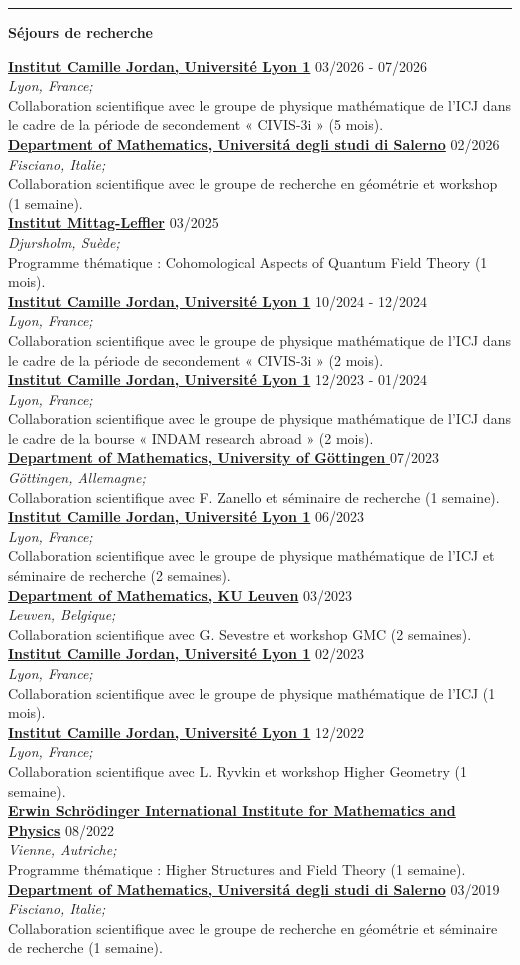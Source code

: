 \documentclass[a4paper]{article}
\newcommand{\block}[1]{\hrule \vspace{0.2cm} \textbf{\Large #1} \vspace{0.2cm}}
\newcommand{\voice}[5]{\href{#4}{\textbf{#1}} \hfill #2 \\ \textit{#3} \\ {\small #5} \vspace{0.2cm} \\}
\begin{document}
\vspace{1em}

	\block{Séjours de recherche}

    \voice{Institut Camille Jordan, Université Lyon 1}
        {03/2026 - 07/2026}
        {Lyon, France;}
        {https://physmath.pages.math.cnrs.fr/}
        {Collaboration scientifique avec le groupe de physique mathématique de l'ICJ dans le cadre de la période de secondement « CIVIS-3i » (5 mois).}
    \voice{Department of Mathematics, Universit\'a degli studi di Salerno}
        {02/2026}
        {Fisciano, Italie;}
        {http://geometria.dipmat.unisa.it/events.html}
        {Collaboration scientifique avec le groupe de recherche en géométrie et workshop (1 semaine).}
    \voice{Institut Mittag-Leffler}
        {03/2025}
        {Djursholm, Suède;}
        {https://www.mittag-leffler.se/activities/cohomological-aspects-of-quantum-field-theory/}
        {Programme thématique : Cohomological Aspects of Quantum Field Theory (1 mois).}
    \voice{Institut Camille Jordan, Université Lyon 1}
        {10/2024 - 12/2024}
        {Lyon, France;}
        {https://physmath.pages.math.cnrs.fr/}
        {Collaboration scientifique avec le groupe de physique mathématique de l'ICJ dans le cadre de la période de secondement « CIVIS-3i » (2 mois).}
	\voice{Institut Camille Jordan, Université Lyon 1}
		{12/2023 - 01/2024}
		{Lyon, France;}
		{None}
		{Collaboration scientifique avec le groupe de physique mathématique de l'ICJ dans le cadre de la bourse « INDAM research abroad » (2 mois).}
	\voice{Department of Mathematics, University of Göttingen }
		{07/2023}
		{Göttingen, Allemagne;}
		{None}
		{Collaboration scientifique avec F. Zanello et séminaire de recherche (1 semaine).}
	\voice{Institut Camille Jordan, Université Lyon 1}
		{06/2023}
		{Lyon, France;}
		{None}
		{Collaboration scientifique avec le groupe de physique mathématique de l'ICJ et séminaire de recherche (2 semaines).}
	\voice{Department of Mathematics, KU Leuven}
		{03/2023}
		{Leuven, Belgique;}
		{None}
		{Collaboration scientifique avec G. Sevestre et workshop GMC (2 semaines).}
	\voice{Institut Camille Jordan, Université Lyon 1}
		{02/2023}
		{Lyon, France;}
		{None}
		{Collaboration scientifique avec le groupe de physique mathématique de l'ICJ (1 mois).}
	\voice{Institut Camille Jordan, Université Lyon 1}
		{12/2022}
		{Lyon, France;}
		{None}
		{Collaboration scientifique avec L. Ryvkin et workshop Higher Geometry (1 semaine).}
	\voice{Erwin Schrödinger International Institute for Mathematics and Physics}
		{08/2022}
		{Vienne, Autriche;}
		{https://www.esi.ac.at/events/e430/}
		{Programme thématique : Higher Structures and Field Theory (1 semaine).}
	\voice{Department of Mathematics, Universit\'a degli studi di Salerno}
		{03/2019}
		{Fisciano, Italie;}
		{http://geometria.dipmat.unisa.it/events.html}
		{Collaboration scientifique avec le groupe de recherche en géométrie et séminaire de recherche (1 semaine).}
\end{document}
